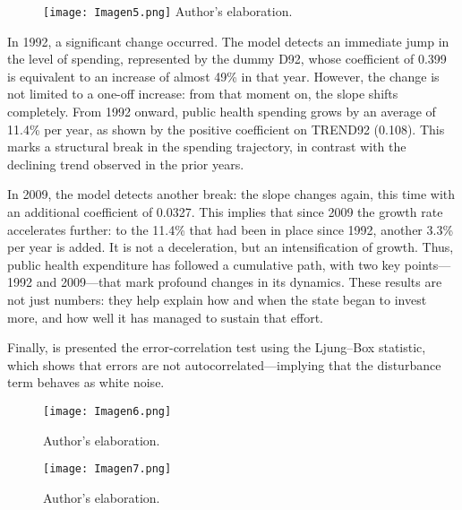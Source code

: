 \documentclass[12pt]{article}
\begin{document}
\begin{figure}[H]
\par\vspace{0.8em}
\texttt{[image: Imagen5.png]}
{\footnotesize Author’s elaboration.}
\end{figure}

In 1992, a significant change occurred. The model detects an immediate jump in the level of spending, represented by the dummy D92, whose coefficient of 0.399 is equivalent to an increase of almost 49\% in that year. However, the change is not limited to a one-off increase: from that moment on, the slope shifts completely. From 1992 onward, public health spending grows by an average of 11.4\% per year, as shown by the positive coefficient on TREND92 (0.108). This marks a structural break in the spending trajectory, in contrast with the declining trend observed in the prior years.

In 2009, the model detects another break: the slope changes again, this time with an additional coefficient of 0.0327. This implies that since 2009 the growth rate accelerates further: to the 11.4\% that had been in place since 1992, another 3.3\% per year is added. It is not a deceleration, but an intensification of growth. Thus, public health expenditure has followed a cumulative path, with two key points—1992 and 2009—that mark profound changes in its dynamics. These results are not just numbers: they help explain how and when the state began to invest more, and how well it has managed to sustain that effort.

Finally, is presented the error-correlation test using the Ljung–Box statistic, which shows that errors are not autocorrelated—implying that the disturbance term behaves as white noise.

\begin{figure}[H]
\par\vspace{0.8em}
\texttt{[image: Imagen6.png]}

{\footnotesize Author’s elaboration.}
\end{figure}

\begin{figure}[H]
\par\vspace{0.8em}
\texttt{[image: Imagen7.png]}

{\footnotesize Author’s elaboration.}
\end{figure}
\end{document}
